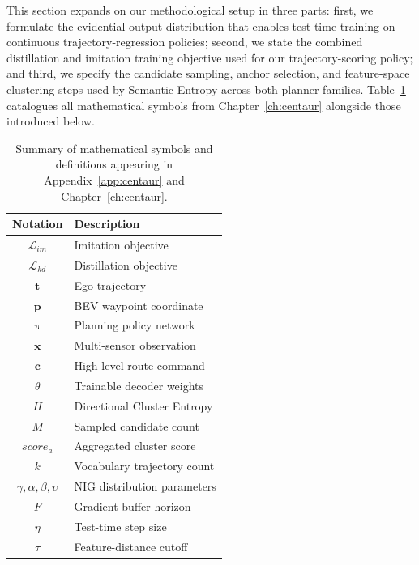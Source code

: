 This section expands on our methodological setup in three parts: first, we formulate the evidential output distribution that enables test-time training on continuous trajectory-regression policies; second, we state the combined distillation and imitation training objective used for our trajectory-scoring policy; and third, we specify the candidate sampling, anchor selection, and feature-space clustering steps used by Semantic Entropy across both planner families. Table~\ref{centaur:tab:notation} catalogues all mathematical symbols from Chapter~\ref{ch:centaur} alongside those introduced below.

\begin{table}[t]
  \centering
  \caption[Mathematical symbols for Chapter~\ref{ch:centaur}]{Summary of mathematical symbols and definitions appearing in Appendix~\ref{app:centaur} and Chapter~\ref{ch:centaur}.}
  \label{centaur:tab:notation}
  \begin{tabular}{cl}
    \toprule
    \textbf{Notation} & \textbf{Description} \\
    \midrule
    $\mathcal{L}_{im}$ & Imitation objective \\
    $\mathcal{L}_{kd}$ & Distillation objective \\
    $\mathbf{t}$ & Ego trajectory \\
    $\mathbf{p}$ & BEV waypoint coordinate \\
    $\pi$ & Planning policy network \\
    $\mathbf{x}$ & Multi-sensor observation \\
    $\mathbf{c}$ & High-level route command \\
    $\theta$ & Trainable decoder weights \\
    $H$ & Directional Cluster Entropy \\
    $M$ & Sampled candidate count \\
    $\mathit{score}_a$ & Aggregated cluster score \\
    $k$ & Vocabulary trajectory count \\
    $\gamma, \alpha, \beta, \upsilon$ & NIG distribution parameters \\
    $F$ & Gradient buffer horizon \\
    $\eta$ & Test-time step size \\
    $\tau$ & Feature-distance cutoff \\
    \bottomrule
  \end{tabular}
\end{table}

